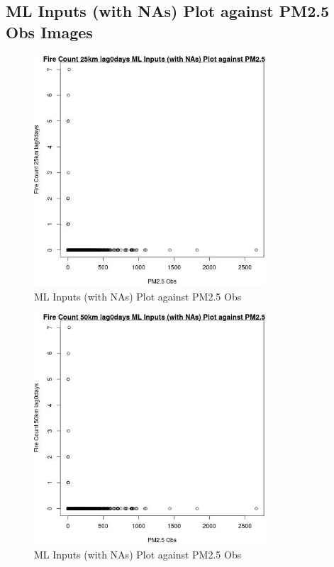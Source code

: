 
\subsection{ML Inputs (with NAs) Plot against PM2.5 Obs Images} 
 

\begin{figure} 
\centering  
\includegraphics[width=0.77\textwidth]{Code_Outputs/Report_ML_input_PM25_Step4_part_e_de_duplicated_aves_compiled_2019-05-20wNAs_Fire_Count_25km_lag0daysvPM25_Obs.jpg} 
\caption{\label{fig:Report_ML_input_PM25_Step4_part_e_de_duplicated_aves_compiled_2019-05-20wNAsFire_Count_25km_lag0daysvPM25_Obs}ML Inputs (with NAs) Plot against PM2.5 Obs} 
\end{figure} 
 

\begin{figure} 
\centering  
\includegraphics[width=0.77\textwidth]{Code_Outputs/Report_ML_input_PM25_Step4_part_e_de_duplicated_aves_compiled_2019-05-20wNAs_Fire_Count_50km_lag0daysvPM25_Obs.jpg} 
\caption{\label{fig:Report_ML_input_PM25_Step4_part_e_de_duplicated_aves_compiled_2019-05-20wNAsFire_Count_50km_lag0daysvPM25_Obs}ML Inputs (with NAs) Plot against PM2.5 Obs} 
\end{figure} 
 


